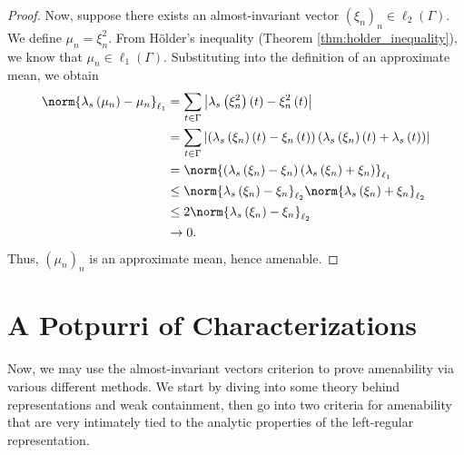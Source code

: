 \begin{proof}
  Now, suppose there exists an almost-invariant vector $\left( \xi_n \right)_n\in \ell_2\left( \Gamma \right)$. We define $\mu_n = \xi_n^2$. From Hölder's inequality (Theorem \ref{thm:holder_inequality}), we know that $\mu_n\in \ell_1\left( \Gamma \right)$. Substituting into the definition of an approximate mean, we obtain
  \begin{align*}
    \norm{\lambda_s\left( \mu_n \right) - \mu_n}_{\ell_1} &= \sum_{t\in\Gamma}\left\vert \lambda_s\left( \xi_n^2 \right)\left( t \right) - \xi_n^2\left( t \right)\right\vert\\
                                                          &= \sum_{t\in\Gamma}\left\vert \left( \lambda_s\left( \xi_n \right)(t) - \xi_n\left( t \right) \right)\left( \lambda_s\left( \xi_n \right)(t) + \lambda_s\left( t \right) \right) \right\vert\\
                                                          &= \norm{\left( \lambda_s\left( \xi_n \right) - \xi_n \right)\left( \lambda_s\left( \xi_n \right) + \xi_n \right)}_{\ell_1}\\
                                                          &\leq \norm{\lambda_s\left( \xi_n \right) - \xi_n}_{\ell_2}\norm{\lambda_s\left( \xi_n \right) + \xi_n}_{\ell_2}\\
                                                          &\leq 2\norm{\lambda_s\left( \xi_n \right) - \xi_n}_{\ell_2}\\
                                                          &\rightarrow 0.
  \end{align*}
  Thus, $\left( \mu_n \right)_n$ is an approximate mean, hence amenable.
\end{proof}
\section{A Potpurri of Characterizations}%
Now, we may use the almost-invariant vectors criterion to prove amenability via various different methods. We start by diving into some theory behind representations and weak containment, then go into two criteria for amenability that are very intimately tied to the analytic properties of the left-regular representation.

